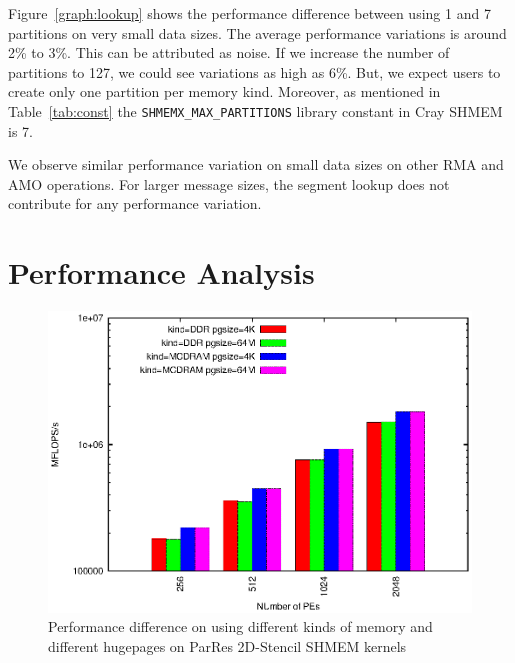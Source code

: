 Figure~\ref{graph:lookup} shows the
performance difference between using 1 and 7 partitions on very small
data sizes. The average performance variations is around 2\% to
3\%. This can be attributed as noise. If we increase
the number of partitions to 127, we could see variations as high
as 6\%. But, we expect users to create only one partition per
memory kind.
Moreover, as mentioned in
Table~\ref{tab:const} the \texttt{SHMEMX\_MAX\_PARTITIONS} library
constant in Cray SHMEM is 7.

We observe similar performance variation on small data sizes on other
RMA and AMO operations. For larger message sizes, the segment lookup
does not contribute for any performance variation.

\section{Performance Analysis}
\label{src:perf}

\begin{figure}[h!]
    \centering
    \includegraphics[width=\linewidth]{graph/2d-stencil.eps}
    \caption{Performance difference on using different kinds of memory
    and different hugepages on ParRes 2D-Stencil SHMEM kernels}
    \label{graph:2dstencil}
\end{figure}

